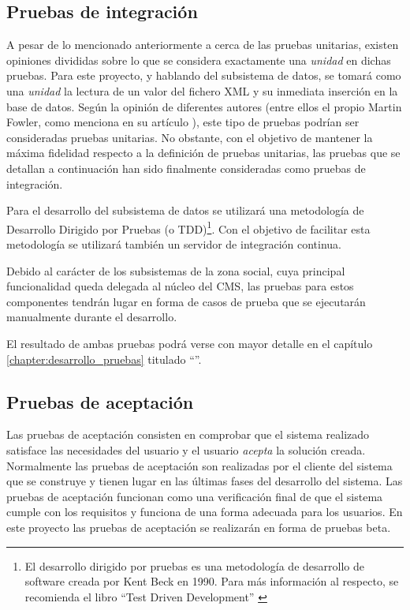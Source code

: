 \subsection{Pruebas de integración}
A pesar de lo mencionado anteriormente a cerca de las pruebas unitarias, existen opiniones divididas sobre lo que se considera exactamente una \textit{unidad} en dichas pruebas.  Para este proyecto, y hablando del subsistema de datos, se tomará como una \textit{unidad} la lectura de un valor del fichero XML y su inmediata inserción en la base de datos.\newline
Según la opinión de diferentes autores (entre ellos el propio Martin Fowler, como menciona en su artículo \cite{mfowler:unit-testing}), este tipo de pruebas podrían ser consideradas pruebas unitarias.  No obstante, con el objetivo de mantener la máxima fidelidad respecto a la definición de pruebas unitarias, las pruebas que se detallan a continuación han sido finalmente consideradas como pruebas de integración.

Para el desarrollo del subsistema de datos se utilizará una metodología de Desarrollo Dirigido por Pruebas (o TDD)\footnote{El desarrollo dirigido por pruebas es una metodología de desarrollo de software creada por Kent Beck en 1990.  Para más información al respecto, se recomienda el libro ``Test Driven Development'' \cite{kbeck:test-driven-development}}.  Con el objetivo de facilitar esta metodología se utilizará también un servidor de integración continua.

Debido al carácter de los subsistemas de la zona social, cuya principal funcionalidad queda delegada al núcleo del CMS, las pruebas para estos componentes tendrán lugar en forma de casos de prueba que se ejecutarán manualmente durante el desarrollo.  

El resultado de ambas pruebas podrá verse con mayor detalle en el capítulo \ref{chapter:desarrollo_pruebas} titulado ``''.


\subsection{Pruebas de aceptación}
Las pruebas de aceptación consisten en comprobar que el sistema realizado satisface las necesidades del usuario y el usuario \textit{acepta} la solución creada.  Normalmente las pruebas de aceptación son realizadas por el cliente del sistema que se construye y tienen lugar en las últimas fases del desarrollo del sistema.  Las pruebas de aceptación funcionan como una verificación final de que el sistema cumple con los requisitos y funciona de una forma adecuada para los usuarios.
En este proyecto las pruebas de aceptación se realizarán en forma de pruebas beta.


